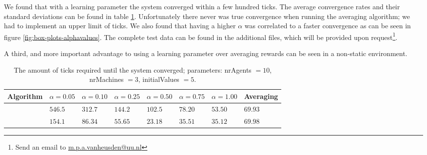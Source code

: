 \documentclass[12pt]{article}
\begin{document}
\begin{enumerate}
	We found that with a learning parameter the system converged within a few hundred ticks.
	The average convergence rates and their standard deviations can be found in table \ref{table:Ex1-TestSummaries}.
	Unfortunately there never was true convergence when running the averaging algorithm; we had to implement an upper limit of ticks.
	We also found that having a higher $\alpha$ was correlated to a faster convergence as can be seen in figure \ref{fig:box-plots-alphavalues}.
	The complete test data can be found in the additional files, which will be provided upon request\footnote{Send an email to \href{mailto:m.p.a.vanheusden@uu.nl}{m.p.a.vanheusden@uu.nl}}.

	A third, and more important advantage to using a learning parameter over averaging rewards can be seen in a non-static environment.

	\begin{table}[]
	\begin{tabular}{l|lllllll}
	Algorithm & $\alpha = 0.05$ & $\alpha = 0.10$ & $\alpha = 0.25$ & $\alpha = 0.50$ & $\alpha = 0.75$ & $\alpha = 1.00$ & Averaging   \\
	\hline
	          & $546.5$     & $312.7$     & $144.2$     & $102.5$     & $78.20$     & $53.50$     & $69.93$       \\
	          & $154.1$     & $86.34$     & $55.65$     & $23.18$     & $35.51$     & $35.12$     & $69.98$
	\end{tabular}
	    \caption{The amount of ticks required until the system converged; parameters: nrAgents $=10$, nrMachines $=3$, initialValues $=5$.}
	    \label{table:Ex1-TestSummaries}
	\end{table}


\end{enumerate}
\end{document}
